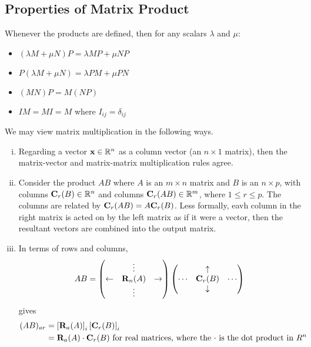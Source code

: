 \subsection{Properties of Matrix Product}
Whenever the products are defined, then for any scalars \(\lambda\) and \(\mu\):
\begin{itemize}
	\item \((\lambda M + \mu N)P = \lambda MP + \mu NP\)
	\item \(P(\lambda M + \mu N) = \lambda PM + \mu PN\)
	\item \((MN)P = M(NP)\)
	\item \(IM = MI = M\) where \(I_{ij} = \delta_{ij}\)
\end{itemize}
We may view matrix multiplication in the following ways.
\begin{enumerate}[(i)]
	\item Regarding a vector \(\vb x \in \mathbb R^n\) as a column vector (an \(n \times 1\) matrix), then the matrix-vector and matrix-matrix multiplication rules agree.
	\item Consider the product \(AB\) where \(A\) is an \(m \times n\) matrix and \(B\) is an \(n \times p\), with columns \(\vb C_r(B) \in \mathbb R^n\) and columns \(\vb C_r(AB) \in \mathbb R^m\), where \(1 \leq r \leq p\). The columns are related by \(\vb C_r(AB) = A \vb C_r(B)\). Less formally, eavh column in the right matrix is acted on by the left matrix as if it were a vector, then the resultant vectors are combined into the output matrix.
	\item In terms of rows and columns,
	      \[ AB = \begin{pmatrix}
			                 & \vdots     &             \\
			      \leftarrow & \vb R_n(A) & \rightarrow \\
			                 & \vdots     &
		      \end{pmatrix} \begin{pmatrix}
			             & \uparrow   &        \\
			      \cdots & \vb C_r(B) & \cdots \\
			             & \downarrow &
		      \end{pmatrix} \]
	      gives
	      \begin{align*}
		      (AB)_{ar} & = \left[ \vb R_a(A) \right]_i \left[ \vb C_r(B) \right]_i                                                  \\
		                & = \vb R_a(A) \cdot \vb C_r(B) \text{ for real matrices, where the \(\cdot\) is the dot product in \(R^n\)}
	      \end{align*}
\end{enumerate}

